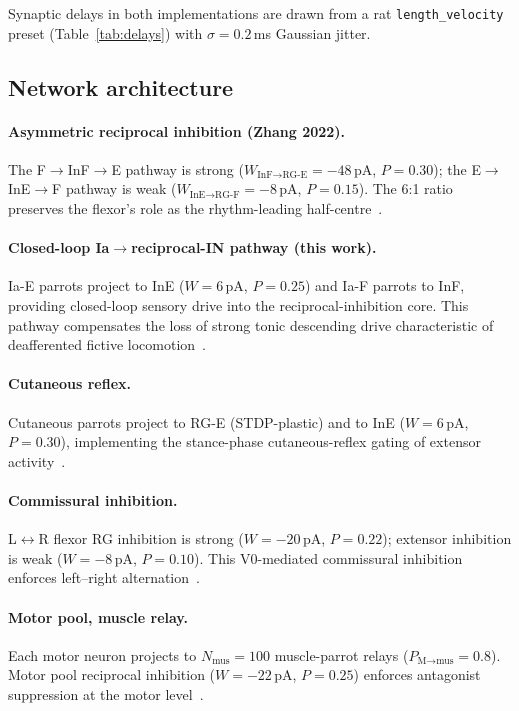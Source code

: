 Synaptic delays in both implementations are drawn from a rat
\texttt{length\_velocity} preset (Table~\ref{tab:delays}) with
$\sigma=0.2$\,ms Gaussian jitter.

\subsection{Network architecture}\label{sec:methods:network}

\paragraph{Asymmetric reciprocal inhibition (Zhang 2022).}
The F$\to$InF$\to$E pathway is strong ($W_{\text{InF}\to\text{RG-E}}=-48$\,pA,
$P=0.30$); the E$\to$InE$\to$F pathway is weak
($W_{\text{InE}\to\text{RG-F}}=-8$\,pA, $P=0.15$).
The 6:1 ratio preserves the flexor's role as the rhythm-leading
half-centre~\cite{zhang2022,talpalar2013}.

\paragraph{Closed-loop Ia$\to$reciprocal-IN pathway (this work).}
Ia-E parrots project to InE ($W=6$\,pA, $P=0.25$) and Ia-F parrots to
InF, providing closed-loop sensory drive into the reciprocal-inhibition
core. This pathway compensates the loss of strong tonic descending drive
characteristic of deafferented fictive locomotion~\cite{pearson1995,
rossignol2006,hultborn2006}.

\paragraph{Cutaneous reflex.}
Cutaneous parrots project to RG-E (STDP-plastic) and to InE
($W=6$\,pA, $P=0.30$), implementing the stance-phase cutaneous-reflex
gating of extensor activity~\cite{forssberg1980,pearson1995}.

\paragraph{Commissural inhibition.}
L$\leftrightarrow$R flexor RG inhibition is strong
($W=-20$\,pA, $P=0.22$); extensor inhibition is weak
($W=-8$\,pA, $P=0.10$). This V0-mediated commissural inhibition
enforces left--right alternation~\cite{kiehn2016,talpalar2013}.

\paragraph{Motor pool, muscle relay.}
Each motor neuron projects to $N_{\text{mus}}=100$ muscle-parrot relays
($P_{\text{M}\to\text{mus}}=0.8$). Motor pool reciprocal inhibition
($W=-22$\,pA, $P=0.25$) enforces antagonist suppression at the motor
level~\cite{mccreaRybak2008}.

